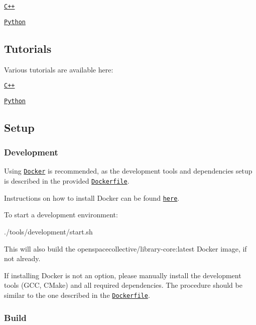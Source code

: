\begin{DoxyItemize}
\item \href{https://open-space-collective.github.io/library-core}{\tt C++}
\item \href{./bindings/python/docs}{\tt Python}
\end{DoxyItemize}

\subsection*{Tutorials}

Various tutorials are available here\+:


\begin{DoxyItemize}
\item \href{./tutorials/cpp}{\tt C++}
\item \href{./tutorials/python}{\tt Python}
\end{DoxyItemize}

\subsection*{Setup}

\subsubsection*{Development}

Using \href{https://www.docker.com}{\tt Docker} is recommended, as the development tools and dependencies setup is described in the provided \href{./tools/development/docker/Dockerfile}{\tt Dockerfile}.

Instructions on how to install Docker can be found \href{https://docs.docker.com/install/}{\tt here}.

To start a development environment\+:


\begin{DoxyCode}
./tools/development/start.sh
\end{DoxyCode}


This will also build the {\ttfamily openspacecollective/library-\/core\+:latest} Docker image, if not already.

If installing Docker is not an option, please manually install the development tools (G\+CC, C\+Make) and all required dependencies. The procedure should be similar to the one described in the \href{./tools/development/docker/Dockerfile}{\tt Dockerfile}.

\subsubsection*{Build}

